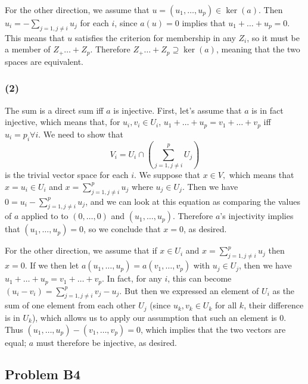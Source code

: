 \documentclass{article}
\begin{document}
For the other direction, we assume that $u = (u_1,\dots,u_p) \in \ker(a)$.
Then $u_i = -\sum_{j = 1, j \neq i} u_j$ for each $i$, since $a(u) = 0$ implies
that $u_1 + \dots + u_p = 0$.
This means that $u$ satisfies the criterion for membership in any $Z_i$, so it
must be a member of $Z_ + \dots + Z_p$.
Therefore $Z_ + \dots + Z_p \supseteq \ker(a)$, meaning that the two spaces are
equivalent.

\subsubsection{(2)}
The sum is a direct sum iff $a$ is injective.
First, let's assume that $a$ is in fact injective, which means that, for
$u_i,v_i \in U_i$,
$u_1 + \dots + u_p = v_1 + \dots + v_p$ iff $u_i = p_i \forall i$.
We need to show that
\[V_i = U_i \cap \left( \sum_{j=1,j\neq i}^p U_j \right)\]
is the trivial vector space for each $i$. We suppose that $x \in V,$ which means that
$x = u_i \in U_i$ and $x = \displaystyle{\sum_{j=1,j \neq i}^p} u_j$ where
$u_j \in U_j$.
Then we have $0 = u_i - \displaystyle{\sum_{j=1,j \neq i}^p} u_j$, and we can
look at this equation as comparing the values of $a$ applied to to $(0,\dots,0)$
and $(u_1,\dots,u_p)$. Therefore $a$'s injectivity implies that $(u_1,\dots,u_p)
= 0$, so we conclude that $x = 0$, as desired.

\medskip
For the other direction, we assume that if $x \in U_i$ and $x =
\displaystyle{\sum_{j=1,j \neq i}^p} u_j$ then $x = 0$.
If we then let $a(u_1,\dots,u_p) = a(v_1,\dots,v_p)$ with $u_j \in U_j$, then we
have $u_1 + \dots + u_p = v_1 + \dots + v_p$. In fact, for any $i$, this can
become $(u_i - v_i) = \displaystyle{\sum_{j=1,j \neq i}^p} v_j - u_j$. But then
we expressed an element of $U_i$ as the sum of one element from each other $U_j$
(since $u_k, v_k \in U_k$ for all $k$, their difference is in $U_k$), which
allows us to apply our assumption that such an element is 0.
Thus $(u_1,\dots,u_p) - (v_1,\dots,v_p) = 0$, which implies that the two vectors
are equal; $a$ must therefore be injective, as desired.

\subsection{Problem B4}
\end{document}
